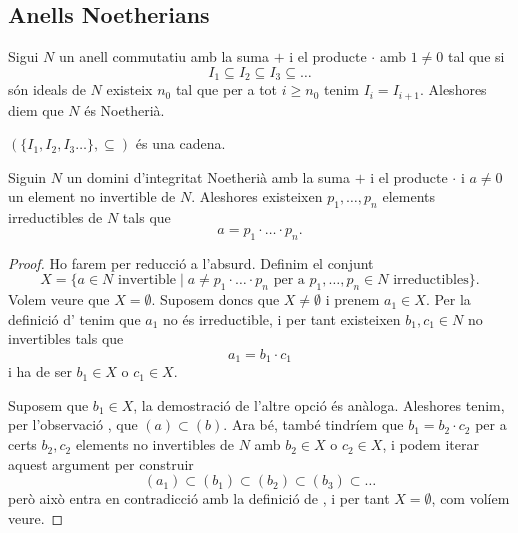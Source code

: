 \documentclass[../Apunts.tex]{subfiles}
\begin{document}
	\subsection{Anells Noetherians}
	\begin{definition}
		\label{def:anell Noetherià}
		Sigui \(N\) un anell commutatiu amb la suma \(+\) i el producte \(\cdot\) amb \(1\neq0\) tal que si
		\[I_{1}\subseteq I_{2}\subseteq I_{3}\subseteq\dots\]
		són ideals de \(N\) existeix \(n_{0}\) tal que per a tot \(i\geq n_{0}\) tenim \(I_{i}=I_{i+1}\). Aleshores diem que \(N\) és Noetherià.
	\end{definition}
	\begin{observation}
		\((\{I_{1},I_{2},I_{3}\dots\},\subseteq)\) és una cadena.
	\end{observation}
	\begin{lemma}
		\label{lema:DIP és DFU}
		Siguin \(N\) un domini d'integritat Noetherià amb la suma \(+\) i el producte \(\cdot\) i \(a\neq0\) un element no invertible de \(N\). Aleshores existeixen \(p_{1},\dots,p_{n}\) elements irreductibles de \(N\) tals que
		\[a=p_{1}\cdot\ldots\cdot p_{n}.\]
		\begin{proof}
			Ho farem per reducció a l'absurd. Definim el conjunt
			\[X=\{a\in N\text{ invertible}\mid a\neq p_{1}\cdot\ldots\cdot p_{n}\text{ per a }p_{1},\dots,p_{n}\in N\text{ irreductibles}\}.\]
			Volem veure que \(X=\emptyset\). Suposem doncs que \(X\neq\emptyset\) i prenem \(a_{1}\in X\). Per la definició d' tenim que \(a_{1}\) no és irreductible, i per tant existeixen \(b_{1},c_{1}\in N\) no invertibles tals que
			\[a_{1}=b_{1}\cdot c_{1}\]
			i ha de ser \(b_{1}\in X\) o \(c_{1}\in X\).
			
			Suposem que \(b_{1}\in X\), la demostració de l'altre opció és anàloga. Aleshores tenim, per l'observació , que \((a)\subset(b)\). Ara bé, també tindríem que \(b_{1}=b_{2}\cdot c_{2}\) per a certs \(b_{2},c_{2}\) elements no invertibles de \(N\) amb \(b_{2}\in X\) o \(c_{2}\in X\), i podem iterar aquest argument per construir
			\[(a_{1})\subset(b_{1})\subset(b_{2})\subset(b_{3})\subset\dots\]
			però això entra en contradicció amb la definició de , i per tant \(X=\emptyset\), com volíem veure.
		\end{proof}
	\end{lemma}
\end{document}
